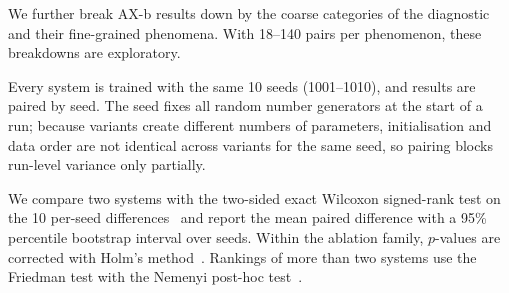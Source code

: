 We further break AX-b results down by the coarse categories of the diagnostic and their fine-grained
phenomena. With 18--140 pairs per phenomenon, these breakdowns are exploratory.

Every system is trained with the same 10 seeds (1001--1010), and results are paired by seed. The seed
fixes all random number generators at the start of a run; because variants create different numbers of
parameters, initialisation and data order are not identical across variants for the same seed, so pairing
blocks run-level variance only partially.

We compare two systems
with the two-sided exact Wilcoxon signed-rank test on the 10 per-seed differences~\citep{wilcoxon1945individual}
and report the mean paired difference with a 95\% percentile bootstrap interval over seeds. Within the
ablation family, $p$-values are corrected with Holm's method~\citep{holm1979simple}. Rankings of more than
two systems use the Friedman test with the Nemenyi post-hoc test~\citep{demsar2006statistical}.
